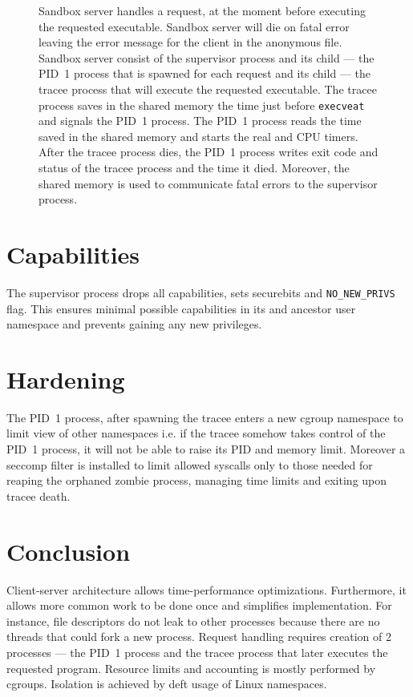 \documentclass[en]{pracamgr}
\begin{document}
\begin{figure}[h]
\begin{tikzpicture}[align=center]
\end{tikzpicture}
\caption{Sandbox server handles a request, at the moment before executing the requested executable. Sandbox server will die on fatal error leaving the error message for the client in the anonymous file. Sandbox server consist of the supervisor process and its child --- the PID~1 process that is spawned for each request and its child --- the tracee process that will execute the requested executable. The tracee process saves in the shared memory the time just before \texttt{execveat} and signals the PID~1 process. The PID~1 process reads the time saved in the shared memory and starts the real and CPU timers. After the tracee process dies, the PID~1 process writes exit code and status of the tracee process and the time it died. Moreover, the shared memory is used to communicate fatal errors to the supervisor process.}
\label{fig:server_handles_request_before_execveat}
\end{figure}

\section{Capabilities}

The supervisor process drops all capabilities, sets securebits and \texttt{NO\_NEW\_PRIVS} flag. This ensures minimal possible capabilities in its and ancestor user namespace and prevents gaining any new privileges.

\section{Hardening}

The PID~1 process, after spawning the tracee enters a new cgroup namespace to limit view of other namespaces i.e. if the tracee somehow takes control of the PID~1 process, it will not be able to raise its PID and memory limit. Moreover a seccomp filter is installed to limit allowed syscalls only to those needed for reaping the orphaned zombie process, managing time limits and exiting upon tracee death.

\section{Conclusion}

Client-server architecture allows time-performance optimizations. Furthermore, it allows more common work to be done once and simplifies implementation. For instance, file descriptors do not leak to other processes because there are no threads that could fork a new process. Request handling requires creation of 2 processes --- the PID~1 process and the tracee process that later executes the requested program. Resource limits and accounting is mostly performed by cgroups. Isolation is achieved by deft usage of Linux namespaces.
\end{document}
